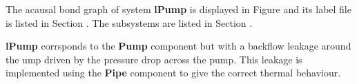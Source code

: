 

   The acausal bond graph of system \textbf{lPump} is
   displayed in Figure  and its label
   file is listed in Section .
   The subsystems are listed in Section .

\textbf{lPump} corrsponds to the \textbf{Pump} component but with a
backflow leakage around the ump driven by the pressure drop across
the pump. This leakage is implemented using the \textbf{Pipe}
component to give the correct thermal behaviour.


